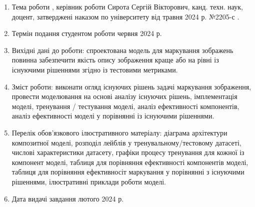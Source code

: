 \documentclass{udstu}
\begin{document}


\begin{enumerate}[1.]
	\item Тема роботи ,
	керівник роботи Сирота Сергій Вікторович, канд. техн. наук, доцент, затверджені наказом по університету
	від  травня 2024 р. №2205-с .

	\item Термін подання студентом роботи  червня 2024 р.

	\item Вихідні дані до роботи: спроектована модель для маркування зображень повинна
	забезпечити якість опису зображення краще або на рівні із існуючими рішеннями згідно із
	тестовими метриками.

	\item Зміст роботи: виконати огляд існуючих рішень задачі маркування зображення,
	провести моделювання на основі аналізу існуючих рішень, імплементація моделі,
	тренування / тестування моделі, аналіз ефективності компонентів,
	аналіз ефективності моделі у порівнянні із існуючими рішеннями.

	\item Перелік обов'язкового ілюстративного матеріалу: діаграма архітектури композитної моделі,
	розподіл лейблів у тренувальному/тестовому датасеті, числові характеристики датасету,
	графіки процесу тренування для кожної із компонент моделі,
	таблиця для порівняння ефективності компонентів моделі,
	таблиця для порівняння ефективносіт маркування у порівнянні з існуючими рішеннями,
	ілюстративні приклади роботи моделі.

	\item Дата видачі завдання  лютого 2024 р.
\end{enumerate}
\end{document}
